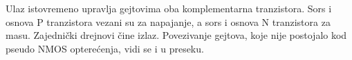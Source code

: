 
Ulaz istovremeno upravlja gejtovima oba komplementarna tranzistora. Sors i osnova P tranzistora vezani su za napajanje, a sors i osnova N tranzistora za masu. Zajednički drejnovi čine izlaz. Povezivanje gejtova, koje nije postojalo kod pseudo NMOS opterećenja, vidi se i u preseku.
